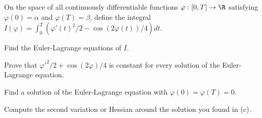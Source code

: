 On the space of all continuously differentiable functions
$\varphi:[0,T]\rightarrow \R$ satisfying $\varphi(0)=\alpha$ and
$\varphi(T)=\beta$, define the integral
$I(\varphi)=\int_0^T(\varphi'(t)^2/2-\cos(2\varphi(t))/4)dt$.
\begin{alist}
\item Find the Euler-Lagrange equations of $I$.
\item Prove that $\varphi'^2/2+\cos(2\varphi)/4$ is constant for every
solution of the Euler-Lagrange equation.
\item Find a solution of the Euler-Lagrange equation with
$\varphi(0)=\varphi(T)=0$.
\item Compute the second variation or Hessian around the solution you
found in (c).
\end{alist}
